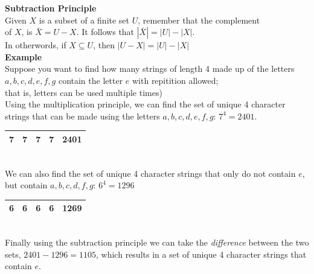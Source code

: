 \documentclass[a4paper,11pt]{article}
\begin{document}
\textbf{Subtraction Principle}\\
Given $X$ is a subset of a finite set $U$, remember that the complement \\of $X$, is $\bar{X}=U-X$. It follows that $|\bar{X}| = |U|-|X|$.\vspace{5pt}\\
In otherwords, if $X \subseteq U$, then $|U-X| = |U|-|X|$\vspace{5pt}\\
\textbf{Example}\\
Suppose you want to find how many strings of length 4 made up of the letters $a,b,c,d,e,f,g$ contain the letter $e$ with repitition allowed;\\that is, letters can be used multiple times)\vspace{5pt}\\
Using the multiplication principle, we can find the set of unique 4 character strings that can be made using the letters $a,b,c,d,e,f,g$: $7^4=2401$.\vspace{5pt}\\
\begin{tabular}{|c|c|c|c|c|}
 \hline
 7 & 7 & 7 & 7 & 2401\\
 \hline
\end{tabular}\vspace{5pt}\\
We can also find the set of unique 4 character strings that only do not contain $e$, but contain $a,b,c,d,f,g$: $6^4 = 1296$\vspace{5pt}\\
\begin{tabular}{|c|c|c|c|c|}
 \hline
 6 & 6 & 6 & 6 & 1269\\
 \hline
\end{tabular}\vspace{5pt}\\
Finally using the subtraction principle we can take the \textit{difference} between the two sets, $2401-1296=1105$, which results in a set of unique 4 character strings that contain $e$.
\end{document}
